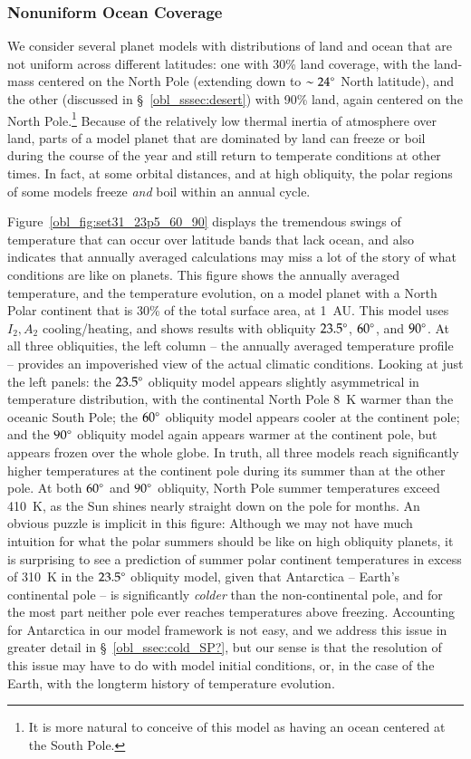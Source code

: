 \subsubsection{Nonuniform Ocean Coverage}
\label{obl_sssec:nonuniform}

We consider several planet models with distributions of land and ocean
that are not uniform across different latitudes: one with 30\% land
coverage, with the land-mass centered on the North Pole (extending
down to $\sim 24\mbox{$^\circ$}$ North latitude), and the other (discussed in
\S~\ref{obl_sssec:desert}) with 90\% land, again centered on the North
Pole.\footnote{It is more natural to conceive of this model as having
an ocean centered at the South Pole.}  Because of the relatively low
thermal inertia of atmosphere over land, parts of a model planet that
are dominated by land can freeze or boil during the course of the year
and still return to temperate conditions at other times.  In fact, at
some orbital distances, and at high obliquity, the polar regions of
some models freeze {\it and} boil within an annual cycle.

Figure~\ref{obl_fig:set31_23p5_60_90} displays the tremendous swings
of temperature that can occur over latitude bands that lack ocean, and
also indicates that annually averaged calculations may miss a lot of
the story of what conditions are like on planets.  This figure shows
the annually averaged temperature, and the temperature evolution, on a
model planet with a North Polar continent that is 30\% of the total
surface area, at 1~AU.  This model uses $I_2,A_2$ cooling/heating, and
shows results with obliquity $23.5\mbox{$^\circ$}$, $60\mbox{$^\circ$}$, and $90\mbox{$^\circ$}$.
At all three obliquities, the left column -- the annually averaged
temperature profile -- provides an impoverished view of the actual
climatic conditions.  Looking at just the left panels: the $23.5\mbox{$^\circ$}$
obliquity model appears slightly asymmetrical in temperature
distribution, with the continental North Pole 8~K warmer than the
oceanic South Pole; the $60\mbox{$^\circ$}$ obliquity model appears cooler at
the continent pole; and the $90\mbox{$^\circ$}$ obliquity model again appears
warmer at the continent pole, but appears frozen over the whole globe.
In truth, all three models reach significantly higher temperatures at
the continent pole during its summer than at the other pole.  At both
$60\mbox{$^\circ$}$ and $90\mbox{$^\circ$}$ obliquity, North Pole summer temperatures
exceed 410~K, as the Sun shines nearly straight down on the pole for
months.  An obvious puzzle is implicit in this figure: Although we may
not have much intuition for what the polar summers should be like on
high obliquity planets, it is surprising to see a prediction of summer
polar continent temperatures in excess of 310~K in the $23.5\mbox{$^\circ$}$
obliquity model, given that Antarctica -- Earth's continental pole --
is significantly {\it colder} than the non-continental pole, and for
the most part neither pole ever reaches temperatures above freezing.
Accounting for Antarctica in our model framework is not easy, and we
address this issue in greater detail in \S~\ref{obl_ssec:cold_SP?},
but our sense is that the resolution of this issue may have to do with
model initial conditions, or, in the case of the Earth, with the
longterm history of temperature evolution.

